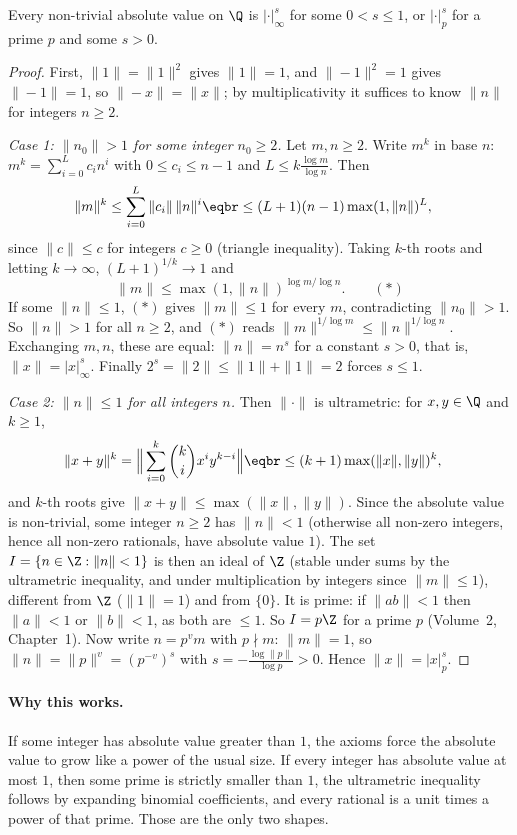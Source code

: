 \begin{theorem}[Ostrowski, 1916]\label{thm:ostrowski}
Every non-trivial absolute value on $\Q$ is $|\cdot|_\infty^s$ for some $0<s\le1$, or $|\cdot|_p^s$ for a prime $p$ and some $s>0$.
\end{theorem}
\begin{proof}
First, $\|1\|=\|1\|^2$ gives $\|1\|=1$, and $\|-1\|^2=1$ gives $\|-1\|=1$, so $\|-x\|=\|x\|$; by multiplicativity it suffices to know $\|n\|$ for integers $n\ge2$.

\emph{Case 1: $\|n_0\|>1$ for some integer $n_0\ge2$.} Let $m,n\ge2$. Write $m^k$ in base $n$: $m^k=\sum_{i=0}^Lc_in^i$ with $0\le c_i\le n-1$ and $L\le k\frac{\log m}{\log n}$. Then
\[
\begin{aligned}&\|m\|^k\le\sum_{i=0}^L\|c_i\|\,\|n\|^i\eqbr\le(L+1)(n-1)\max(1,\|n\|)^L,\end{aligned}
\]
since $\|c\|\le c$ for integers $c\ge0$ (triangle inequality). Taking $k$-th roots and letting $k\to\infty$, $(L+1)^{1/k}\to1$ and
\[
\|m\|\le\max(1,\|n\|)^{\log m/\log n}.\qquad(\ast)
\]
If some $\|n\|\le1$, $(\ast)$ gives $\|m\|\le1$ for every $m$, contradicting $\|n_0\|>1$. So $\|n\|>1$ for all $n\ge2$, and $(\ast)$ reads $\|m\|^{1/\log m}\le\|n\|^{1/\log n}$. Exchanging $m,n$, these are equal: $\|n\|=n^s$ for a constant $s>0$, that is, $\|x\|=|x|_\infty^s$. Finally $2^s=\|2\|\le\|1\|+\|1\|=2$ forces $s\le1$.

\emph{Case 2: $\|n\|\le1$ for all integers $n$.} Then $\|\cdot\|$ is ultrametric: for $x,y\in\Q$ and $k\ge1$,
\[
\begin{aligned}\|x+y\|^k&=\Big\|\sum_{i=0}^k\binom kix^iy^{k-i}\Big\|\eqbr\le(k+1)\max(\|x\|,\|y\|)^k,\end{aligned}
\]
and $k$-th roots give $\|x+y\|\le\max(\|x\|,\|y\|)$. Since the absolute value is non-trivial, some integer $n\ge2$ has $\|n\|<1$ (otherwise all non-zero integers, hence all non-zero rationals, have absolute value $1$). The set $I=\{n\in\Z:\|n\|<1\}$ is then an ideal of $\Z$ (stable under sums by the ultrametric inequality, and under multiplication by integers since $\|m\|\le1$), different from $\Z$ ($\|1\|=1$) and from $\{0\}$. It is prime: if $\|ab\|<1$ then $\|a\|<1$ or $\|b\|<1$, as both are $\le1$. So $I=p\Z$ for a prime $p$ (Volume~2, Chapter~1). Now write $n=p^vm$ with $p\nmid m$: $\|m\|=1$, so $\|n\|=\|p\|^v=(p^{-v})^s$ with $s=-\frac{\log\|p\|}{\log p}>0$. Hence $\|x\|=|x|_p^s$.
\end{proof}

\paragraph{Why this works.}
If some integer has absolute value greater than $1$, the axioms force the absolute value to grow like a power of the usual size. If every integer has absolute value at most $1$, then some prime is strictly smaller than $1$, the ultrametric inequality follows by expanding binomial coefficients, and every rational is a unit times a power of that prime. Those are the only two shapes.

